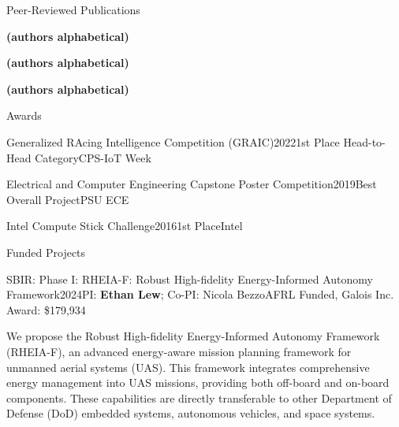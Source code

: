 \documentclass{resume}
\begin{document}
\begin{rSection}{Peer-Reviewed Publications}


\textbf{(authors alphabetical)} 

\textbf{(authors alphabetical)} 




\textbf{(authors alphabetical)} 

\end{rSection}

\begin{rSection}{Awards}
\begin{rSubsectionEmpty}{Generalized RAcing Intelligence Competition (GRAIC)}{2022}{1st Place Head-to-Head Category}{CPS-IoT Week}\end{rSubsectionEmpty}

\begin{rSubsectionEmpty}{Electrical and Computer Engineering Capstone Poster Competition}{2019}{Best Overall Project}{PSU ECE}\end{rSubsectionEmpty}

\begin{rSubsectionEmpty}{Intel Compute Stick Challenge}{2016}{1st Place}{Intel}\end{rSubsectionEmpty}
\end{rSection}


\begin{rSection}{Funded Projects}
\begin{rSubsection}{SBIR: Phase I: RHEIA-F: Robust High-fidelity Energy-Informed Autonomy Framework}{2024}{PI: \textbf{Ethan Lew}; Co-PI: Nicola Bezzo}{AFRL Funded, Galois Inc. Award: \$179,934}
\item We propose the Robust High-fidelity Energy-Informed Autonomy Framework (RHEIA-F), an advanced energy-aware mission planning framework for unmanned aerial systems (UAS). This framework integrates comprehensive energy management into UAS missions, providing both off-board and on-board components. These capabilities are directly transferable to other Department of Defense (DoD) embedded systems, autonomous vehicles, and space systems.
\end{rSubsection}
\end{rSection}
\end{document}
